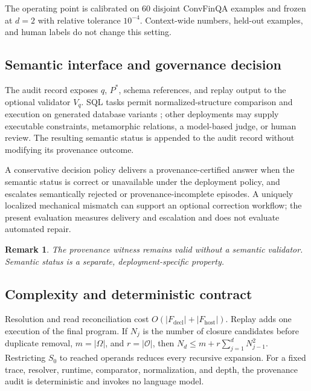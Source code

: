 \documentclass[5p,times]{elsarticle}
\newtheorem{remark}{Remark}
\newcommand{\opset}{\mathcal{O}}
\newcommand{\operands}{\Omega}
\begin{document}
The operating point is calibrated on 60 disjoint ConvFinQA examples and frozen at $d=2$ with relative tolerance $10^{-4}$. Context-wide numbers, held-out examples, and human labels do not change this setting.

\subsection{Semantic interface and governance decision}\label{sec:semanticinterface}

The audit record exposes $q$, $P^*$, schema references, and replay output to the optional validator $V_q$. SQL tasks permit normalized-structure comparison and execution on generated database variants \citep{zhong2020testsuite}; other deployments may supply executable constraints, metamorphic relations, a model-based judge, or human review. The resulting semantic status is appended to the audit record without modifying its provenance outcome.

A conservative decision policy delivers a provenance-certified answer when the semantic status is correct or unavailable under the deployment policy, and escalates semantically rejected or provenance-incomplete episodes. A uniquely localized mechanical mismatch can support an optional correction workflow; the present evaluation measures delivery and escalation and does not evaluate automated repair.



\begin{remark}
The provenance witness remains valid without a semantic validator. Semantic status is a separate, deployment-specific property.
\end{remark}

\subsection{Complexity and deterministic contract}

Resolution and read reconciliation cost $O(|F_{\mathrm{decl}}|+|F_{\mathrm{host}}|)$. Replay adds one execution of the final program. If $N_j$ is the number of closure candidates before duplicate removal, $m=|\operands|$, and $r=|\opset|$, then $N_d\le m+r\sum_{j=1}^{d}N_{j-1}^2$. Restricting $S_0$ to reached operands reduces every recursive expansion. For a fixed trace, resolver, runtime, comparator, normalization, and depth, the provenance audit is deterministic and invokes no language model.
\end{document}

